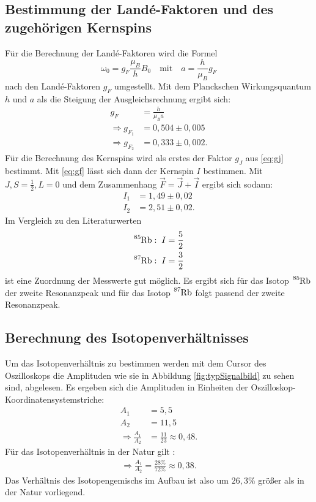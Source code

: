 \subsection{Bestimmung der Landé-Faktoren und des zugehörigen Kernspins}
Für die Berechnung der Landé-Faktoren wird die Formel
\begin{equation}
  \omega_0=g_F\frac{\mu_B}{h}B_0\quad \text{mit}\quad a=\frac{h}{\mu_B}{g_F}
\end{equation}
nach den Landé-Faktoren $g_F$ umgestellt. Mit dem Planckschen Wirkungsquantum $h$ und $a$ als die Steigung der Ausgleichsrechnung ergibt sich:
\begin{align*}
  g_F&=\frac{h}{\mu_Ba}\\
  \Rightarrow g_{F_1}&= 0,504 \pm 0,005\\
  \Rightarrow g_{F_2}&= 0,333 \pm 0,002.
\end{align*}
Für die Berechnung des Kernspins wird als erstes der Faktor $g_J$ aus \eqref{eq:gj} bestimmt. Mit \eqref{eq:gf} lässt sich dann der Kernspin $I$ bestimmen. Mit $J,S=\frac{1}{2}, L=0$ \cite{anleitung} und dem Zusammenhang $\vec{F}=\vec{J}+\vec{I}$ ergibt sich sodann:
\begin{align*}
  I_1&= 1,49\pm 0,02\\
  I_2&= 2,51\pm 0,02.
\end{align*}
Im Vergleich zu den Literaturwerten \cite{rubidium}
\begin{align*}
  \ce{^{85}Rb}&:\; I=\frac{5}{2}\\
  \ce{^{87}Rb}&:\; I=\frac{3}{2}
\end{align*}
ist eine Zuordnung der Messwerte gut möglich. Es ergibt sich für das Isotop $\ce{^{85}Rb}$ der zweite Resonanzpeak und für das Isotop $\ce{^{87}Rb}$ folgt passend der zweite Resonanzpeak.
\subsection{Berechnung des Isotopenverhältnisses}
Um das Isotopenverhältnis zu bestimmen werden mit dem Cursor des Oszilloskops die Amplituden wie sie in Abbildung \ref{fig:typSignalbild} zu sehen sind, abgelesen.
Es ergeben sich die Amplituden in Einheiten der Oszilloskop-Koordinatensystemstriche:
\begin{align*}
A_1&= 5,5\\
A_2&= 11,5\\
\Rightarrow \frac{A_1}{A_2}&=\frac{11}{23}\approx 0,48.
\end{align*}
Für das Isotopenverhältnis in der Natur gilt \cite{rubidium}:
\begin{align*}
\Rightarrow \frac{A_1}{A_2}=\frac{28\%}{72\%}\approx 0,38.
\end{align*}
Das Verhältnis des Isotopengemischs im Aufbau ist also um $26,3\%$ größer als in der Natur vorliegend.
